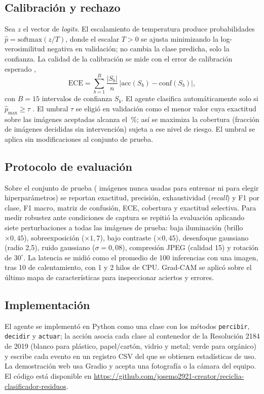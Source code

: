 \documentclass[conference,a4paper]{IEEEtran}
\newcommand{\linkGithub}{\url{https://github.com/josemo2921-creator/reciclia-clasificador-residuos}}
\begin{document}
\subsection{Calibración y rechazo}
Sea $z$ el vector de \emph{logits}. El escalamiento de temperatura \cite{guo2017} produce probabilidades $\hat p = \mathrm{softmax}(z/T)$, donde el escalar $T>0$ se ajusta minimizando la log-verosimilitud negativa en validación; no cambia la clase predicha, solo la confianza. La calidad de la calibración se mide con el error de calibración esperado \cite{naeini2015},
\begin{equation}
\mathrm{ECE}=\sum_{b=1}^{B}\frac{|S_b|}{n}\,\bigl|\mathrm{acc}(S_b)-\mathrm{conf}(S_b)\bigr|,
\end{equation}
con $B=15$ intervalos de confianza $S_b$. El agente clasifica automáticamente solo si $\hat p_{\max}\geq\tau$ \cite{geifman2017}. El umbral $\tau$ se eligió en validación como el menor valor cuya exactitud sobre las imágenes aceptadas alcanza el \objetivoSel\,\%; así se maximiza la cobertura (fracción de imágenes decididas sin intervención) sujeta a ese nivel de riesgo. El umbral se aplica sin modificaciones al conjunto de prueba.

\subsection{Protocolo de evaluación}
Sobre el conjunto de prueba (\nTest{} imágenes nunca usadas para entrenar ni para elegir hiperparámetros) se reportan exactitud, precisión, exhaustividad (\emph{recall}) y F1 por clase, F1 macro, matriz de confusión, ECE, cobertura y exactitud selectiva. Para medir robustez ante condiciones de captura \cite{hendrycks2019} se repitió la evaluación aplicando siete perturbaciones a todas las imágenes de prueba: baja iluminación (brillo $\times0{,}45$), sobreexposición ($\times1{,}7$), bajo contraste ($\times0{,}45$), desenfoque gaussiano (radio 2,5), ruido gaussiano ($\sigma=0{,}08$), compresión JPEG (calidad 15) y rotación de $30^\circ$. La latencia se midió como el promedio de 100 inferencias con una imagen, tras 10 de calentamiento, con 1 y 2 hilos de CPU. Grad-CAM \cite{gradcam} se aplicó sobre el último mapa de características para inspeccionar aciertos y errores.

\subsection{Implementación}
El agente se implementó en Python como una clase con los métodos \texttt{percibir}, \texttt{decidir} y \texttt{actuar}; la acción asocia cada clase al contenedor de la Resolución 2184 de 2019 \cite{res2184} (blanco para plástico, papel/cartón, vidrio y metal; verde para orgánico) y escribe cada evento en un registro CSV del que se obtienen estadísticas de uso. La demostración web usa Gradio \cite{gradio} y acepta una fotografía o la cámara del equipo. El código está disponible en \linkGithub.
\end{document}
